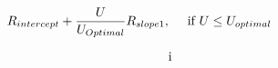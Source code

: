 \documentclass[preview]{standalone}
\begin{document}
\begin{align*}
R_{intercept} +  \frac{U}{U_{Optimal}} R_{slope1}, &\hspace{1.5em} \text{if }  U \leq U_{optimal}  \\[6pt] & \text{i}
\end{align*}
\end{document}
